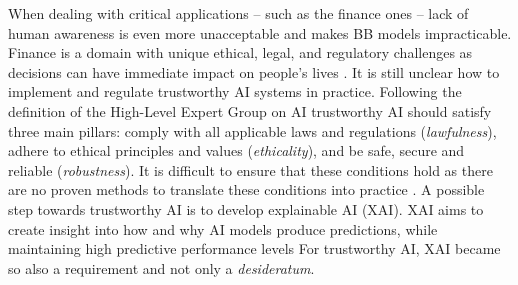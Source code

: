 \documentclass[sigconf]{acmart}
\begin{document}
When dealing with critical applications -- such as the finance ones -- lack of human awareness is even more unacceptable and makes BB models impracticable. 
%
Finance is a domain with unique ethical, legal, and regulatory challenges as decisions can have immediate impact on people's lives \cite{weiss2021business}. 
%
It is still unclear how to implement and regulate trustworthy AI systems in practice. Following the definition of the High-Level Expert Group on AI \cite{egtai} trustworthy AI should satisfy three main pillars: comply with all applicable laws and regulations (\emph{lawfulness}), adhere to ethical principles and values (\emph{ethicality}), and be safe, secure and reliable (\emph{robustness}). It is difficult to ensure that these conditions hold as there are no proven methods to translate these conditions into practice \cite{mittelstadt2019principles}.
%
A possible step towards trustworthy AI is to develop explainable AI (XAI). XAI aims to create insight into how and why AI models produce predictions, while maintaining high predictive performance levels
%
For trustworthy AI, XAI became so also a requirement and not only a \emph{desideratum}.

%
%
%
%
%
%
\end{document}
